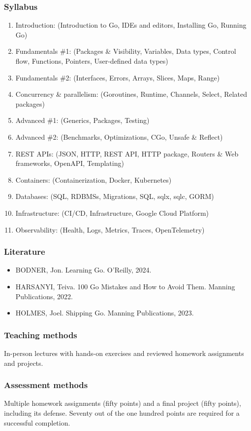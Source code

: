 \documentclass[
  digital,
  color,
  oneside,
  nosansbold,
  nocolorbold,
  lof,
  lot,
]{fithesis4}
\begin{document}
\subsubsection{Syllabus}

\begin{enumerate}
    \item Introduction: (Introduction to Go, IDEs and editors, Installing Go, Running Go)
    \item Fundamentals \#1: (Packages \& Visibility, Variables, Data types, Control flow, Functions, Pointers, User-defined data types)
    \item Fundamentals \#2: (Interfaces, Errors, Arrays, Slices, Maps, Range)
    \item Concurrency \& parallelism: (Goroutines, Runtime, Channels, Select, Related packages)
    \item Advanced \#1: (Generics, Packages, Testing)
    \item Advanced \#2: (Benchmarks, Optimizations, CGo, Unsafe \& Reflect)
    \item REST APIs: (JSON, HTTP, REST API, HTTP package, Routers \& Web frameworks, OpenAPI, Templating)
    \item Containers: (Containerization, Docker, Kubernetes)
    \item Databases: (SQL, RDBMSs, Migrations, SQL, sqlx, sqlc, GORM)
    \item Infrastructure: (CI/CD, Infrastructure, Google Cloud Platform)
    \item Observability: (Health, Logs, Metrics, Traces, OpenTelemetry)
\end{enumerate}

\subsubsection{Literature}

\begin{itemize}
    \item BODNER, Jon. Learning Go. O’Reilly, 2024.\cite{learning-go}
    \item HARSANYI, Teiva. 100 Go Mistakes and How to Avoid Them. Manning Publications, 2022.\cite{100-go-mistakes}
    \item HOLMES, Joel. Shipping Go. Manning Publications, 2023.\cite{shipping-go}
\end{itemize}

\subsubsection{Teaching methods}

In-person lectures with hands-on exercises and reviewed homework assignments and projects.

\subsubsection{Assessment methods}

Multiple homework assignments (fifty points) and a final project (fifty points), including its defense. Seventy out of the one hundred points are required for a successful completion.
\end{document}
